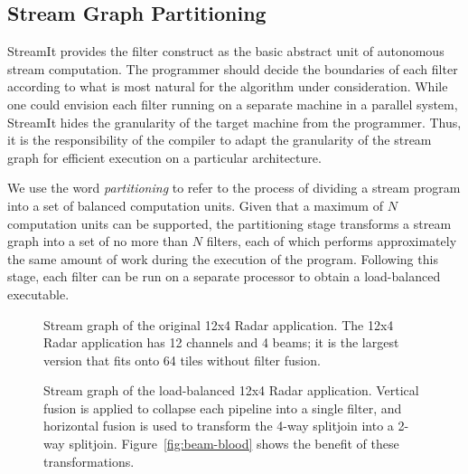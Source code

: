 \newcommand{\mt}[1]{\mbox{\it #1}}

\subsection{Stream Graph Partitioning}
\label{sec:partition}

StreamIt provides the filter construct as the basic abstract unit of
autonomous stream computation.  The programmer should decide the
boundaries of each filter according to what is most natural for the
algorithm under consideration.  While one could envision each filter
running on a separate machine in a parallel system, StreamIt hides the
granularity of the target machine from the programmer.  Thus, it is
the responsibility of the compiler to adapt the granularity of the
stream graph for efficient execution on a particular architecture.

We use the word {\it partitioning} to refer to the process of dividing
a stream program into a set of balanced computation units.  Given that
a maximum of $N$ computation units can be supported, the partitioning
stage transforms a stream graph into a set of no more than $N$
filters, each of which performs approximately the same amount of work
during the execution of the program.  Following this stage, each
filter can be run on a separate processor to obtain a load-balanced
executable.

\begin{figure}[!h]
\centering
\begin{minipage}{3.0in}
\centering
{}
\caption{\protect\small Stream graph of the original 12x4 Radar
application.  The 12x4 Radar application has 12 channels and 4 beams;
it is the largest version that fits onto 64 tiles without filter
fusion.  \protect\label{fig:beam-orig}}
\end{minipage}
\hspace{0.1in}
\begin{minipage}{3.0in}
\centering
{}
\caption{\protect\small Stream graph of the load-balanced 12x4
Radar application.  Vertical fusion is applied to collapse each pipeline
into a single filter, and horizontal fusion is used to transform the
4-way splitjoin into a 2-way splitjoin.  Figure~\ref{fig:beam-blood}
shows the benefit of these
transformations. \protect\label{fig:beam-opt}}
\end{minipage}
\end{figure}

